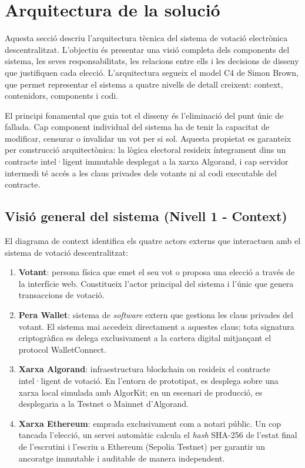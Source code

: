 \section{Arquitectura de la solució}
 
Aquesta secció descriu l'arquitectura tècnica del sistema de votació electrònica descentralitzat. L'objectiu és presentar una visió completa dels components del sistema, les seves responsabilitats, les relacions entre ells i les decisions de disseny que justifiquen cada elecció. L'arquitectura segueix el model C4 de Simon Brown, que permet representar el sistema a quatre nivells de detall creixent: context, contenidors, components i codi.
 
El principi fonamental que guia tot el disseny és l'eliminació del punt únic de fallada. Cap component individual del sistema ha de tenir la capacitat de modificar, censurar o invalidar un vot per si sol. Aquesta propietat es garanteix per construcció arquitectònica: la lògica electoral resideix íntegrament dins un contracte intel·ligent immutable desplegat a la xarxa Algorand, i cap servidor intermedi té accés a les claus privades dels votants ni al codi executable del contracte.
 
\subsection{Visió general del sistema (Nivell 1 - Context)}
 
El diagrama de context identifica els quatre actors externs que interactuen amb el sistema de votació descentralitzat:
 
\begin{enumerate}[label=\roman*.]
    \item \textbf{Votant}: persona física que emet el seu vot o proposa una elecció a través de la interfície web. Constitueix l'actor principal del sistema i l'únic que genera transaccions de votació.
    \item \textbf{Pera Wallet}: sistema de \textit{software} extern que gestiona les claus privades del votant. El sistema mai accedeix directament a aquestes claus; tota signatura criptogràfica es delega exclusivament a la cartera digital mitjançant el protocol WalletConnect.
    \item \textbf{Xarxa Algorand}: infraestructura blockchain on resideix el contracte intel·ligent de votació. En l'entorn de prototipat, es desplega sobre una xarxa local simulada amb AlgorKit; en un escenari de producció, es desplegaria a la Testnet o Mainnet d'Algorand.
    \item \textbf{Xarxa Ethereum}: emprada exclusivament com a notari públic. Un cop tancada l'elecció, un servei automàtic calcula el \textit{hash} SHA-256 de l'estat final de l'escrutini i l'escriu a Ethereum (Sepolia Testnet) per garantir un ancoratge immutable i auditable de manera independent.
\end{enumerate}
 
